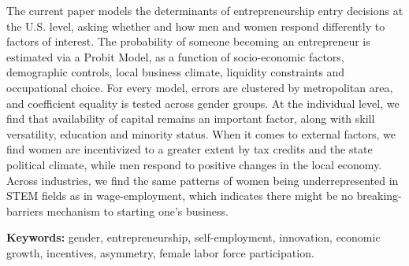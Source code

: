 \singlespacing 
The current paper models the determinants of entrepreneurship entry decisions at the U.S. level, asking whether and how men and women respond differently to factors of interest. The probability of someone becoming an entrepreneur is estimated via a Probit Model, as a function of socio-economic factors, demographic controls, local business climate, liquidity constraints and occupational choice. For every model, errors are clustered by metropolitan area, and coefficient equality is tested across gender groups. At the individual level, we find that availability of capital remains an important factor, along with skill versatility, education and minority status. When it comes to external factors, we find women are incentivized to a greater extent by tax credits and the state political climate, while men respond to positive changes in the local economy. Across industries, we find the same patterns of women being underrepresented in STEM fields as in wage-employment, which indicates there might be no breaking-barriers mechanism to starting one's business. 

\singlespacing \textbf{Keywords:} gender, entrepreneurship, self-employment, innovation, economic growth, incentives, asymmetry, female labor force participation.

\bodyspacing